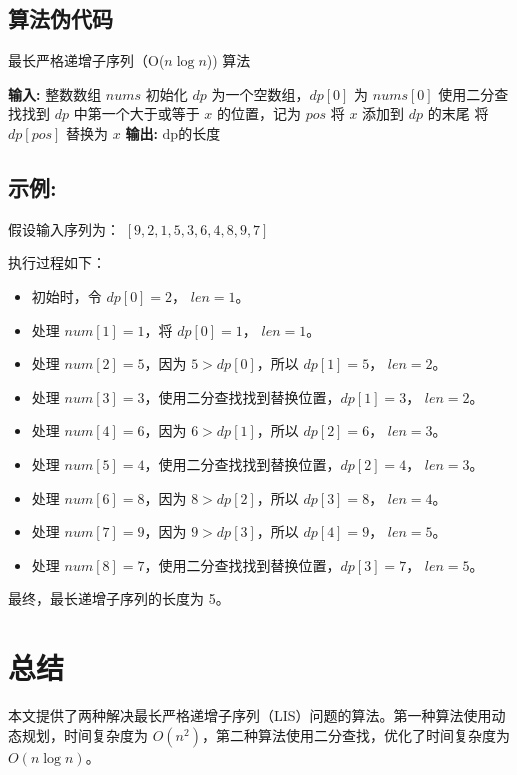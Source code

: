 \documentclass[UTF8]{ctexart}
\begin{document}
\subsection{算法伪代码}
\begin{algorithm}
\caption{最长严格递增子序列（O($n \log n$)) 算法}
\begin{algorithmic}[1]
\STATE \textbf{输入:} 整数数组 \( nums \)
\STATE 初始化 \( dp \) 为一个空数组，\( dp[0] \) 为 \( nums[0] \)
    \STATE 使用二分查找找到 \( dp \) 中第一个大于或等于 \( x \) 的位置，记为 \( pos \)
        \STATE 将 \( x \) 添加到 \( dp \) 的末尾
    \ELSE
        \STATE 将 \( dp[pos] \) 替换为 \( x \)
    \ENDIF
\ENDFOR
\STATE \textbf{输出:} \( \text{dp的长度} \)
\end{algorithmic}
\end{algorithm}
\subsection{示例:}
假设输入序列为：
\([9, 2, 1, 5, 3, 6, 4, 8, 9, 7]\)

执行过程如下：

\begin{itemize}
    \item 初始时，令 \( dp[0] = 2 \)， \( len = 1 \)。
    \item 处理 \( num[1] = 1 \)，将 \( dp[0] = 1 \)， \( len = 1 \)。
    \item 处理 \( num[2] = 5 \)，因为 \( 5 > dp[0] \)，所以 \( dp[1] = 5 \)， \( len = 2 \)。
    \item 处理 \( num[3] = 3 \)，使用二分查找找到替换位置，\( dp[1] = 3 \)， \( len = 2 \)。
    \item 处理 \( num[4] = 6 \)，因为 \( 6 > dp[1] \)，所以 \( dp[2] = 6 \)， \( len = 3 \)。
    \item 处理 \( num[5] = 4 \)，使用二分查找找到替换位置，\( dp[2] = 4 \)， \( len = 3 \)。
    \item 处理 \( num[6] = 8 \)，因为 \( 8 > dp[2] \)，所以 \( dp[3] = 8 \)， \( len = 4 \)。
    \item 处理 \( num[7] = 9 \)，因为 \( 9 > dp[3] \)，所以 \( dp[4] = 9 \)， \( len = 5 \)。
    \item 处理 \( num[8] = 7 \)，使用二分查找找到替换位置，\( dp[3] = 7 \)， \( len = 5 \)。
\end{itemize}

最终，最长递增子序列的长度为 5。

\section{总结}
本文提供了两种解决最长严格递增子序列（LIS）问题的算法。第一种算法使用动态规划，时间复杂度为 \( O(n^2) \)，第二种算法使用二分查找，优化了时间复杂度为 \( O(n \log n) \)。
\end{document}

